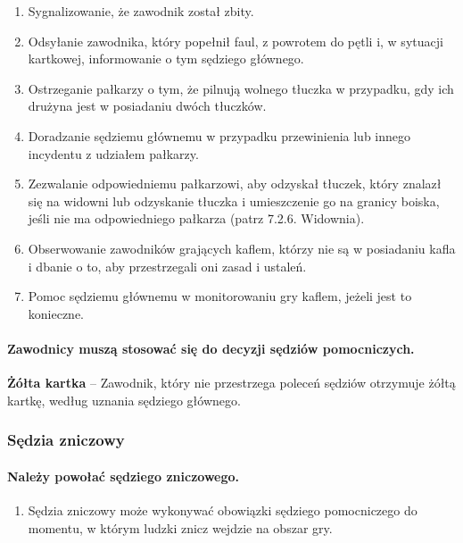 \documentclass[12pt]{article}
\newcommand\yellowcard[1]{\bgroup\textcolor{darkyellow}{\textbf{#1}}}
\begin{document}
\begin{enumerate}
	\item Sygnalizowanie, że zawodnik został zbity.

	\item Odsyłanie zawodnika, który popełnił faul, z powrotem do pętli i, w
	      sytuacji kartkowej, informowanie o tym sędziego głównego.

	\item Ostrzeganie pałkarzy o tym, że pilnują wolnego tłuczka w przypadku,
	      gdy ich drużyna jest w posiadaniu dwóch tłuczków.

	\item Doradzanie sędziemu głównemu w przypadku przewinienia lub innego
	      incydentu z udziałem pałkarzy.

	\item Zezwalanie odpowiedniemu pałkarzowi, aby odzyskał tłuczek, który
	      znalazł się na widowni lub odzyskanie tłuczka i umieszczenie go na
	      granicy boiska, jeśli nie ma odpowiedniego pałkarza (patrz 7.2.6.
	      Widownia).

	\item Obserwowanie zawodników grających kaflem, którzy nie są w posiadaniu
	      kafla i dbanie o to, aby przestrzegali oni zasad i ustaleń.

	\item Pomoc sędziemu głównemu w monitorowaniu gry kaflem, jeżeli jest to
	      konieczne.
\end{enumerate}

\paragraph{Zawodnicy muszą stosować się do decyzji sędziów
	pomocniczych.}

\yellowcard{Żółta kartka} -- Zawodnik, który nie przestrzega poleceń sędziów
otrzymuje żółtą kartkę, według uznania sędziego głównego.

\subsubsection{Sędzia zniczowy}

\paragraph{Należy powołać sędziego zniczowego.}

\begin{enumerate}
	\item
	      Sędzia zniczowy może wykonywać obowiązki sędziego pomocniczego do
	      momentu, w którym ludzki znicz wejdzie na obszar gry.
\end{enumerate}
\end{document}
